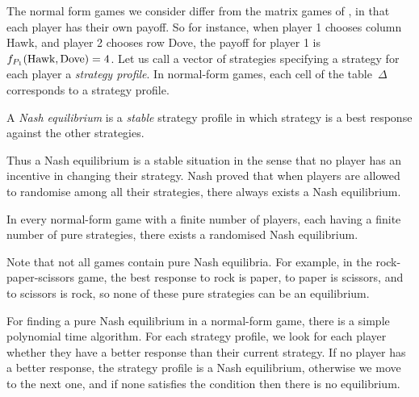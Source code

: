 The normal form games we consider differ from the matrix games of , in that each player has their own payoff.
So for instance, when player 1 chooses column Hawk, and player 2 chooses
row Dove, the payoff for player 1 is $f_{P_1}(\text{Hawk}, \text{Dove}) = 4$.
Let us call a vector of strategies specifying a strategy for each player a \emph{strategy profile}. In normal-form games, each cell of the table~$\Delta$ corresponds to a strategy profile.

\begin{definition}
  A \emph{Nash equilibrium} is a \emph{stable} strategy profile in which
  strategy is a best response against the other strategies.
\end{definition}
Thus a Nash equilibrium is a stable situation in the sense that
no player has an incentive in changing their strategy.
Nash proved that when
players are allowed to randomise among all their strategies, there always
exists a Nash equilibrium.

\begin{theorem}
In every normal-form game with a finite number of
players, each having a finite number of pure strategies, there exists a
randomised Nash equilibrium.
\end{theorem}

Note that not all games contain pure Nash equilibria.
For example, in the rock-paper-scissors game, the best response to rock
is paper, to paper is scissors, and to scissors is rock, so none of these
pure strategies can be an equilibrium.

For finding a pure Nash equilibrium in a normal-form game, there is a simple
polynomial time algorithm.
For each strategy profile, we look for each player whether they have a better
response than their current strategy.
If no player has a better response, the strategy profile is a Nash equilibrium,
otherwise we move to the next one, and if none satisfies the condition then there is no equilibrium.


